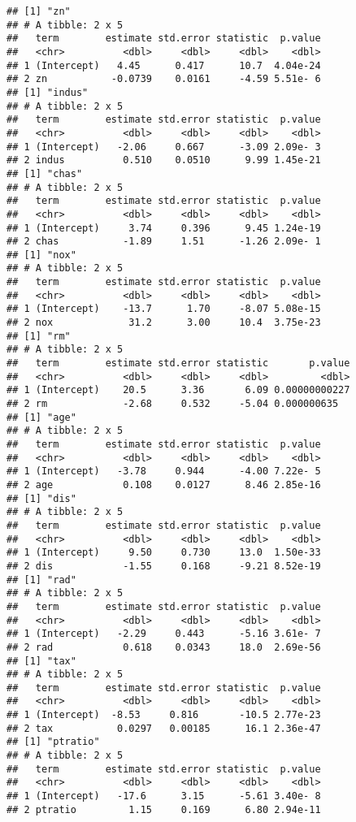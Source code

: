 \documentclass[
]{article}
\begin{document}
\begin{verbatim}
## [1] "zn"
## # A tibble: 2 x 5
##   term        estimate std.error statistic  p.value
##   <chr>          <dbl>     <dbl>     <dbl>    <dbl>
## 1 (Intercept)   4.45      0.417      10.7  4.04e-24
## 2 zn           -0.0739    0.0161     -4.59 5.51e- 6
## [1] "indus"
## # A tibble: 2 x 5
##   term        estimate std.error statistic  p.value
##   <chr>          <dbl>     <dbl>     <dbl>    <dbl>
## 1 (Intercept)   -2.06     0.667      -3.09 2.09e- 3
## 2 indus          0.510    0.0510      9.99 1.45e-21
## [1] "chas"
## # A tibble: 2 x 5
##   term        estimate std.error statistic  p.value
##   <chr>          <dbl>     <dbl>     <dbl>    <dbl>
## 1 (Intercept)     3.74     0.396      9.45 1.24e-19
## 2 chas           -1.89     1.51      -1.26 2.09e- 1
## [1] "nox"
## # A tibble: 2 x 5
##   term        estimate std.error statistic  p.value
##   <chr>          <dbl>     <dbl>     <dbl>    <dbl>
## 1 (Intercept)    -13.7      1.70     -8.07 5.08e-15
## 2 nox             31.2      3.00     10.4  3.75e-23
## [1] "rm"
## # A tibble: 2 x 5
##   term        estimate std.error statistic       p.value
##   <chr>          <dbl>     <dbl>     <dbl>         <dbl>
## 1 (Intercept)    20.5      3.36       6.09 0.00000000227
## 2 rm             -2.68     0.532     -5.04 0.000000635  
## [1] "age"
## # A tibble: 2 x 5
##   term        estimate std.error statistic  p.value
##   <chr>          <dbl>     <dbl>     <dbl>    <dbl>
## 1 (Intercept)   -3.78     0.944      -4.00 7.22e- 5
## 2 age            0.108    0.0127      8.46 2.85e-16
## [1] "dis"
## # A tibble: 2 x 5
##   term        estimate std.error statistic  p.value
##   <chr>          <dbl>     <dbl>     <dbl>    <dbl>
## 1 (Intercept)     9.50     0.730     13.0  1.50e-33
## 2 dis            -1.55     0.168     -9.21 8.52e-19
## [1] "rad"
## # A tibble: 2 x 5
##   term        estimate std.error statistic  p.value
##   <chr>          <dbl>     <dbl>     <dbl>    <dbl>
## 1 (Intercept)   -2.29     0.443      -5.16 3.61e- 7
## 2 rad            0.618    0.0343     18.0  2.69e-56
## [1] "tax"
## # A tibble: 2 x 5
##   term        estimate std.error statistic  p.value
##   <chr>          <dbl>     <dbl>     <dbl>    <dbl>
## 1 (Intercept)  -8.53     0.816       -10.5 2.77e-23
## 2 tax           0.0297   0.00185      16.1 2.36e-47
## [1] "ptratio"
## # A tibble: 2 x 5
##   term        estimate std.error statistic  p.value
##   <chr>          <dbl>     <dbl>     <dbl>    <dbl>
## 1 (Intercept)   -17.6      3.15      -5.61 3.40e- 8
## 2 ptratio         1.15     0.169      6.80 2.94e-11

\end{verbatim}
\end{document}
